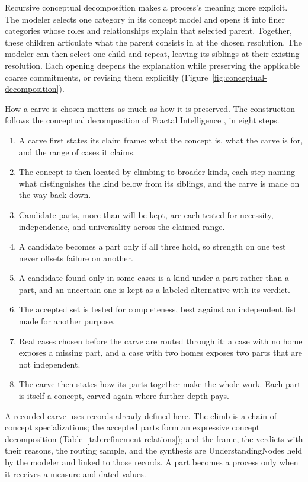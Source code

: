 \documentclass[11pt,a4paper]{article}
\begin{document}
Recursive conceptual decomposition makes a process's meaning more explicit.
The modeler selects one category in its concept model and opens it into finer
categories whose roles and relationships explain that selected parent.
Together, these children articulate what the parent consists in at the chosen
resolution. The modeler can then select one child and repeat, leaving its
siblings at their existing resolution. Each opening deepens the explanation
while preserving the applicable coarse commitments, or revising them explicitly
(Figure~\ref{fig:conceptual-decomposition}).

How a carve is chosen matters as much as how it is preserved. The construction
follows the conceptual decomposition of Fractal Intelligence
\cite{westerbergFractal2026}, in eight steps.

\begin{enumerate}
  \item A carve first states its claim frame: what the concept is, what the
    carve is for, and the range of cases it claims.
  \item The concept is then located by climbing to broader kinds, each step
    naming what distinguishes the kind below from its siblings, and the carve
    is made on the way back down.
  \item Candidate parts, more than will be kept, are each tested for
    necessity, independence, and universality across the claimed range.
  \item A candidate becomes a part only if all three hold, so strength on one
    test never offsets failure on another.
  \item A candidate found only in some cases is a kind under a part rather
    than a part, and an uncertain one is kept as a labeled alternative with
    its verdict.
  \item The accepted set is tested for completeness, best against an
    independent list made for another purpose.
  \item Real cases chosen before the carve are routed through it: a case with
    no home exposes a missing part, and a case with two homes exposes two
    parts that are not independent.
  \item The carve then states how its parts together make the whole work.
    Each part is itself a concept, carved again where further depth pays.
\end{enumerate}

A recorded carve uses records already defined here. The climb is a chain of
concept specializations; the accepted parts form an expressive concept
decomposition (Table~\ref{tab:refinement-relations}); and the frame, the verdicts
with their reasons, the routing sample, and the synthesis are UnderstandingNodes
held by the modeler and linked to those records. A part becomes a process only
when it receives a measure and dated values.
\end{document}
